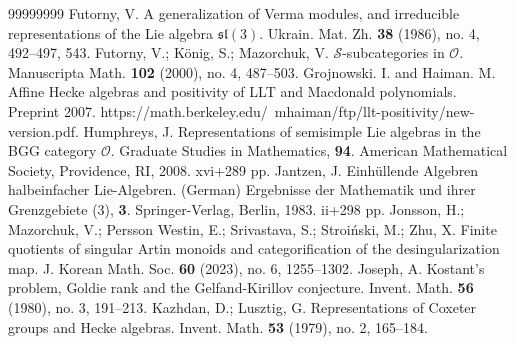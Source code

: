 \documentclass[a4paper]{amsart}
\begin{document}
\begin{thebibliography}{99999999}
Futorny, V.
A generalization of Verma modules, and irreducible representations of 
the Lie algebra $\mathfrak{sl}(3)$.
Ukrain. Mat. Zh. {\bf 38} (1986), no. 4, 492--497, 543.
Futorny, V.; K{\"o}nig, S.; Mazorchuk, V.
$\mathscr{S}$-subcategories in $\mathcal{O}$.
Manuscripta Math. {\bf 102} (2000), no. 4, 487--503.
Grojnowski. I. and Haiman. M. 
Affine Hecke algebras and positivity of LLT and Macdonald polynomials.
Preprint 2007.
https://math.berkeley.edu/~mhaiman/ftp/llt-positivity/new-version.pdf. 
 Humphreys, J. Representations of semisimple Lie algebras in the 
BGG category $\mathcal{O}$. Graduate Studies in Mathematics, {\bf 94}. 
American Mathematical Society, Providence, RI, 2008. xvi+289 pp.
 Jantzen, J. 
Einh{\"u}llende Algebren halbeinfacher Lie-Algebren. (German) 
Ergebnisse der Mathematik und ihrer Grenzgebiete (3), {\bf 3}. 
Springer-Verlag, Berlin, 1983. ii+298 pp.
Jonsson, H.; Mazorchuk, V.; 
Persson Westin, E.; Srivastava, S.; Stroi{\'n}ski, M.; Zhu, X.
Finite quotients of singular Artin monoids and categorification of the desingularization map.
J. Korean Math. Soc. {\bf 60} (2023), no. 6, 1255--1302.
 Joseph, A. Kostant's problem, 
Goldie rank and the Gelfand-Kirillov 
conjecture. Invent. Math. {\bf 56} (1980), no. 3, 191--213.
 Kazhdan, D.; Lusztig, G. Representations of Coxeter groups and 
Hecke algebras. Invent. Math. {\bf 53} (1979), no. 2, 165--184. 

\end{thebibliography}
\end{document}
